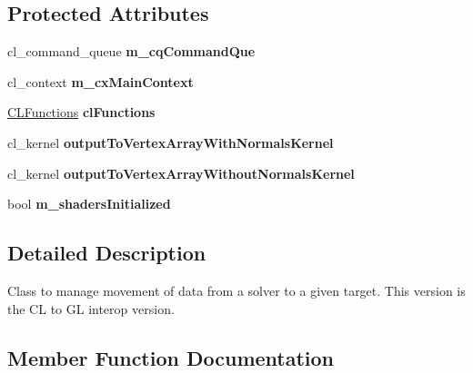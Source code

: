 \subsection*{Protected Attributes}
\begin{DoxyCompactItemize}
\item 
\mbox{\label{classbtSoftBodySolverOutputCLtoGL_a2056c3ef5cf8b8aa511dae3f1edd6cb3}} 
cl\+\_\+command\+\_\+queue {\bfseries m\+\_\+cq\+Command\+Que}
\item 
\mbox{\label{classbtSoftBodySolverOutputCLtoGL_a4ad5da5de4efd90a262d050b806ca513}} 
cl\+\_\+context {\bfseries m\+\_\+cx\+Main\+Context}
\item 
\mbox{\label{classbtSoftBodySolverOutputCLtoGL_ab27a637e6a862d6631c14708e973b7b7}} 
\hyperlink{classCLFunctions}{C\+L\+Functions} {\bfseries cl\+Functions}
\item 
\mbox{\label{classbtSoftBodySolverOutputCLtoGL_a92e45d1faba046fff346f3be0201fc5c}} 
cl\+\_\+kernel {\bfseries output\+To\+Vertex\+Array\+With\+Normals\+Kernel}
\item 
\mbox{\label{classbtSoftBodySolverOutputCLtoGL_a8ff0a3f5498fe35986145a58a199af78}} 
cl\+\_\+kernel {\bfseries output\+To\+Vertex\+Array\+Without\+Normals\+Kernel}
\item 
\mbox{\label{classbtSoftBodySolverOutputCLtoGL_ac66f59814bbba6c16f8b147bf934c930}} 
bool {\bfseries m\+\_\+shaders\+Initialized}
\end{DoxyCompactItemize}


\subsection{Detailed Description}
Class to manage movement of data from a solver to a given target. This version is the CL to GL interop version. 

\subsection{Member Function Documentation}
\mbox{\label{classbtSoftBodySolverOutputCLtoGL_ab6f232898b815166551373a6c2d95b58}} 
